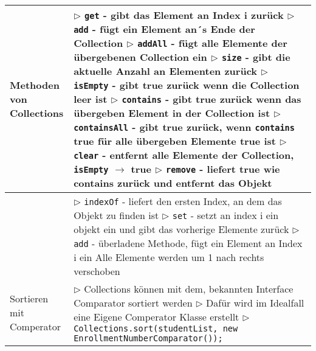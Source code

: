 \begin{table}[H]
\begin{tabular}{ | p{4cm} p{13.5cm} | }
	\makecell[l]{Methoden von \\ Collections} & 
	\makecell[l]
	{
	$\rhd$ \texttt{get} - gibt das Element an Index i zurück \\
	$\rhd$ \texttt{add} - fügt ein Element an´s Ende der Collection \\
	$\rhd$ \texttt{addAll} - fügt alle Elemente der übergebenen Collection ein \\
	$\rhd$ \texttt{size} - gibt die aktuelle Anzahl an Elementen zurück \\
	$\rhd$ \texttt{isEmpty} - gibt true zurück wenn die Collection leer ist \\
	$\rhd$ \texttt{contains} - gibt true zurück wenn das übergeben Element in der Collection ist \\
	$\rhd$ \texttt{containsAll} - gibt true zurück, wenn \texttt{contains} true \\ 
	\hspace{2.9cm} für alle übergeben Elemente true ist \\
	$\rhd$ \texttt{clear} - entfernt alle Elemente der Collection, \texttt{isEmpty} $\rightarrow$ true \\
	$\rhd$ \texttt{remove} - liefert true wie contains zurück und entfernt das Objekt \\
	} 	\\ \hline


	\makecell[l]{List: Methoden} & 
	\makecell[l]
	{
	$\rhd$ \texttt{indexOf} - liefert den ersten Index, an dem das Objekt zu finden ist \\
	$\rhd$ \texttt{set} - setzt an index i ein objekt ein und gibt das vorherige Elemente zurück \\
	$\rhd$ \texttt{add} - überladene Methode, fügt ein Element an Index i ein \\
	\hspace{1.3cm} Alle Elemente werden um 1 nach rechts verschoben
	} 	\\ \hline


	\makecell[l]{Sortieren mit \\ Comperator} & 
	\makecell[l]
	{
	$\rhd$ Collections können mit dem, bekannten Interface Comparator sortiert werden \\
	$\rhd$ Dafür wird im Idealfall eine Eigene Comperator Klasse erstellt \\
	$\rhd$ \texttt{Collections.sort(studentList, new EnrollmentNumberComparator());}
	} 	\\ \hline


	\end{tabular}
	\end{table}



